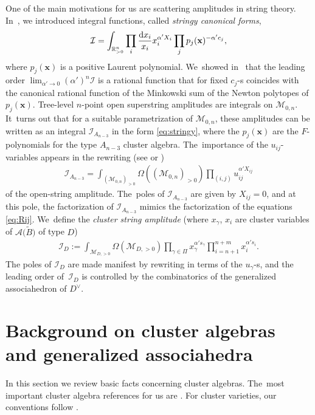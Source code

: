 \documentclass[pdftex]{sigma}%
\def\R{{\mathbb R}}
\def\A{{\mathcal{A}}}
\def\tB{{\tilde B}}
\def\I{{\mathcal{I}}}
\def\M{{\mathcal{M}}}
\def\tB{{\tilde B}}
\def\x{{\mathbf x}}
\numberwithin{equation}{section}
\begin{document}
\bigskip{} One of the main motivations for us are scattering amplitudes in string theory. In~\cite{AHL}, we introduced integral functions, called {\it stringy canonical forms},
\begin{gather}\label{eq:stringy}
\I = \int_{\R_{>0}^n} \prod_i \frac{{\rm d}x_i}{x_i} x_i^{\alpha' X_i} \prod_j p_j(\x)^{-\alpha' c_j},
\end{gather}
{\sloppy
where $p_j(\x)$ is a positive Laurent polynomial. We~showed in~\cite{AHL} that the leading order
 $\lim_{\alpha' \to 0} (\alpha')^n \I$ is a rational function that for fixed $c_j$-s coincides with the canonical rational function \cite{ABL} of the Minkowski sum of the Newton polytopes of $p_j(\x)$. Tree-level $n$-point open superstring amplitudes are integrals on $\M_{0,n}$. It~turns out that for a suitable parametrization of $\M_{0,n}$, these amplitudes can be written as an integral $\I_{A_{n-3}}$ in the form \eqref{eq:stringy}, where the $p_j(\x)$ are the $F$-polynomials for the type $A_{n-3}$ cluster algebra. The~importance of the $u_{ij}$-variables appears in the rewriting (see \cite[Section~9]{AHL} or \cite[Section~3]{BD})
\begin{gather*}
\I_{A_{n-3}} = \int_{(\M_{0,n})_{>0}} \Omega((\M_{0,n})_{>0}) \prod_{(i,j)} u_{ij}^{\alpha' X_{ij}}
\end{gather*}}\noindent
of the open-string amplitude. The~poles of $\I_{A_{n-3}}$ are given by $X_{ij} = 0$, and at this pole, the factorization of $\I_{A_{n-3}}$ mimics the factorization of the equations \eqref{eq:Rij}. We~define the \emph{cluster string amplitude} (where $x_\gamma$, $x_i$ are cluster variables of $\A\big(\tB\big)$ of type $D$)
\begin{gather*}
\I_D:= \int_{\M_{D,>0}} \Omega(\M_{D,>0}) \prod_{\gamma \in \Pi} x_\gamma^{\alpha' s_\gamma} \prod_{i=n+1}^{n+m} x_i^{\alpha' s_i}.
\end{gather*}
The poles of $\I_D$ are made manifest by rewriting in terms of the $u_\gamma$-s, and the leading order of~$\I_D$ is controlled by the combinatorics of the generalized associahedron of $D^\vee$.

\section{Background on cluster algebras and generalized associahedra}
In this section we review basic facts concerning cluster algebras. The~most important cluster algebra references for us are \cite{BDMTY,YZ}. For cluster varieties, our conventions follow \cite{LS}.
\end{document}
